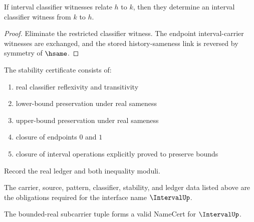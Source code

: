 \begin{theorem}
\label{thm:interval-classifier-symmetry}
If interval classifier witnesses relate \(h\) to \(k\), then they determine an
interval classifier witness from \(k\) to \(h\).
\end{theorem}
\begin{proof}
Eliminate the restricted classifier witness. The endpoint interval-carrier
witnesses are exchanged, and the stored history-sameness link is reversed by
symmetry of \(\hsame\).
\end{proof}

\begin{definition}
\label{def:interval-stability-certificate}
The stability certificate consists of:
\begin{enumerate}
  \item real classifier reflexivity and transitivity
  \item lower-bound preservation under real sameness
  \item upper-bound preservation under real sameness
  \item closure of endpoints \(0\) and \(1\)
  \item closure of interval operations explicitly proved to preserve bounds
\end{enumerate}
\end{definition}

\begin{definition}
\label{def:interval-ledger-policy}
Record the real ledger and both inequality moduli.
\end{definition}

\begin{definition}
\label{def:interval-certificate-obligations}
The carrier, source, pattern, classifier, stability, and ledger data listed above are the obligations required for the interface name \(\IntervalUp\).
\end{definition}

\begin{theorem}
\label{thm:concrete-interval-namecert}
The bounded-real subcarrier tuple forms a valid NameCert for \(\IntervalUp\).
\end{theorem}

